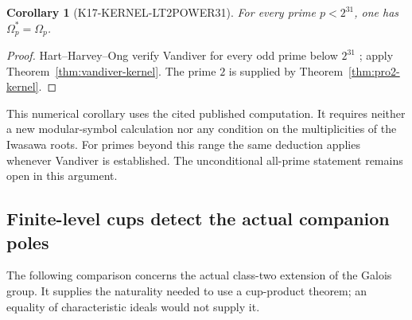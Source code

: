 \documentclass[11pt,a4paper]{article}
\newtheorem{corollary}[theorem]{Corollary}
\theoremstyle{definition}
\begin{document}
\begin{corollary}[K17-KERNEL-LT2POWER31]\label{cor:kernel-lt2power31}
For every prime $p<2^{31}$, one has $\Omega_p^*=\Omega_p$.
\end{corollary}

\begin{proof}
Hart--Harvey--Ong verify Vandiver for every odd prime below $2^{31}$
\cite[\S1, item~(2), p.~1]{HartHarveyOng2017}; apply
Theorem~\ref{thm:vandiver-kernel}. The prime $2$ is supplied by
Theorem~\ref{thm:pro2-kernel}.
\end{proof}

This numerical corollary uses the cited published computation. It
requires neither a new modular-symbol calculation nor any condition
on the multiplicities of the Iwasawa roots. For primes beyond this
range the same deduction applies whenever Vandiver is established.
The unconditional all-prime statement remains open in this argument.

\subsection{Finite-level cups detect the actual companion poles}

The following comparison concerns the actual class-two extension of
the Galois group. It supplies the naturality needed to use a cup-product
theorem; an equality of characteristic ideals would not supply it.
\end{document}
